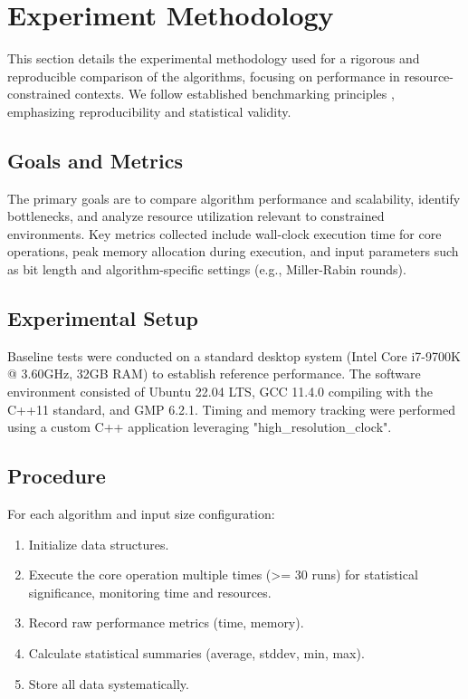 \section{Experiment Methodology}
This section details the experimental methodology used for a rigorous and reproducible comparison of the algorithms, focusing on performance in resource-constrained contexts. We follow established benchmarking principles \cite{resource_constrained, embedded_benchmarking}, emphasizing reproducibility and statistical validity.

\subsection{Goals and Metrics}
The primary goals are to compare algorithm performance and scalability, identify bottlenecks, and analyze resource utilization relevant to constrained environments. Key metrics collected include wall-clock execution time for core operations, peak memory allocation during execution, and input parameters such as bit length and algorithm-specific settings (e.g., Miller-Rabin rounds).

\subsection{Experimental Setup}
Baseline tests were conducted on a standard desktop system (Intel Core i7-9700K @ 3.60GHz, 32GB RAM) to establish reference performance. The software environment consisted of Ubuntu 22.04 LTS, GCC 11.4.0 compiling with the C++11 standard, and GMP 6.2.1. Timing and memory tracking were performed using a custom C++ application leveraging "high\_resolution\_clock".

\subsection{Procedure}
For each algorithm and input size configuration:
\begin{enumerate}
    \item Initialize data structures.
    \item Execute the core operation multiple times (>= 30 runs) for statistical significance, monitoring time and resources.
    \item Record raw performance metrics (time, memory).
    \item Calculate statistical summaries (average, stddev, min, max).
    \item Store all data systematically.
\end{enumerate}

